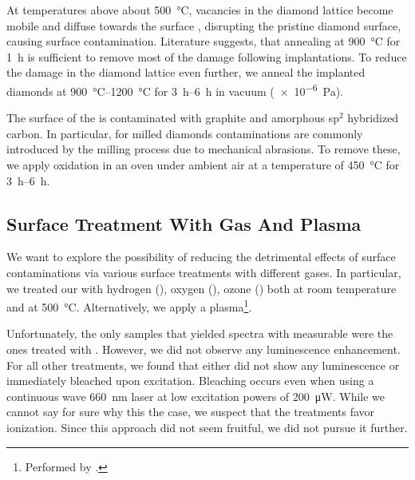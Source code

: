 				At temperatures above about \SI{500}{\celsius}, vacancies in the diamond lattice become mobile and diffuse towards the surface \cite{Dresselhaus1992}, disrupting the pristine diamond surface, causing surface contamination.
				Literature suggests, that annealing at \SI{900}{\celsius} for \SI{1}{\hour} is sufficient to remove most of the damage following implantations.
				To reduce the damage in the diamond lattice even further, we anneal the implanted diamonds at \SIrange{900}{1200}{\celsius} for \SIrange{3}{6}{h} in vacuum (\SI{e-6}{Pa}).
				
				The surface of the \nds is contaminated with graphite and amorphous sp$^2$ hybridized carbon. In particular, for milled diamonds contaminations are commonly introduced by the milling process due to mechanical abrasions. To remove these, we apply oxidation in an oven under ambient air at a temperature of \SI{450}{\celsius} for \SIrange{3}{6}{h}.

			\subsection{Surface Treatment With Gas And Plasma}\label{subsec::plasma}

				We want to explore the possibility of reducing the detrimental effects of surface contaminations via various surface treatments with different gases.
				In particular, we treated our \nds with hydrogen (), oxygen (), ozone () both at room temperature and at  \SI{500}{\celsius}. Alternatively, we apply a  plasma\footnote{Performed by \williams.}.
				
				Unfortunately, the only samples that yielded spectra with measurable \ZPLs were the ones treated with . However, we did not observe any luminescence enhancement.
				For all other treatments, we found that \nds either did not show any luminescence or immediately bleached upon excitation. Bleaching occurs even when using a continuous wave \SI{660}{nm} laser at low excitation powers of \SI{200}{\micro\watt}. While we cannot say for sure why this the case, we suspect that the treatments favor \siv ionization. Since this approach did not seem fruitful, we did not pursue it further.
				
